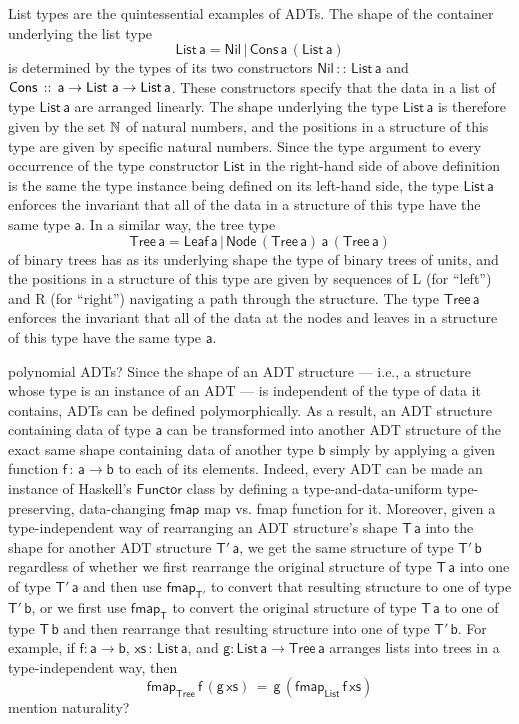 \documentclass[acmsmall,screen,review,anonymous]{acmart}
\theoremstyle{definition}
\begin{document}
List types are the quintessential examples of ADTs. The shape of the
container underlying the list type
\[\mathsf{List\,a} = \mathsf{Nil} \,|\, \mathsf{Cons\,a\,(List\,a)}\]
is determined by the types of its two constructors $\mathsf{Nil\, ::\,
  List\, a}$ and $\mathsf{Cons \,::\,a \to \mathsf{List}\,\,a\to
  List\,a}$. These constructors specify that the data in a list of
type $\mathsf{List\,a}$ are arranged linearly. The shape underlying
the type $\mathsf{List\,a}$ is therefore given by the set $\mathbb{N}$ of
natural numbers, and the positions in a structure of this type are
given by specific natural numbers. Since the type argument to every
occurrence of the type constructor $\mathsf{List}$ in the right-hand
side of above definition is the same the type instance being defined
on its left-hand side, the type $\mathsf{List\,a}$ enforces the
invariant that all of the data in a structure of this type have the
same type $\mathsf{a}$. In a similar way, the tree type
\[\mathsf{Tree\, a} = \mathsf{Leaf\,a}
\,|\,\mathsf{Node\,(Tree\,a)\,a\,(Tree\,a)}\] of binary trees
has as its underlying shape the type of binary trees of units, and the
positions in a structure of this type are given by sequences of L (for
``left'') and R (for ``right'') navigating a path
through the structure. The type $\mathsf{Tree\, a}$ enforces the
invariant that all of the data at the nodes and leaves in a structure
of this type have the same type $\mathsf{a}$.

{\color{blue} polynomial ADTs?} Since the shape of an ADT structure
--- i.e., a structure whose type is an instance of an ADT --- is
independent of the type of data it contains, ADTs can be defined
polymorphically. As a result, an ADT structure containing data of type
$\mathsf{a}$ can be transformed into another ADT structure of the
exact same shape containing data of another type $\mathsf{b}$ simply
by applying a given function $\mathsf{f \,:\,a \to b}$ to each of its
elements. Indeed, every ADT can be made an instance of Haskell's
$\mathsf{Functor}$ class by defining a type-and-data-uniform
type-preserving, data-changing $\mathsf{fmap}$ {\color{blue} map
  vs. fmap} function for it.  Moreover, given a type-independent way
of rearranging an ADT structure's shape $\mathsf{T\,a}$ into the shape
for another ADT structure $\mathsf{T'\,a}$, we get the same structure
of type $\mathsf{T'\,b}$ regardless of whether we first rearrange the
original structure of type $\mathsf{T\,a}$ into one of type
$\mathsf{T'\,a}$ and then use $\mathsf{fmap_{T'}}$ to convert that
resulting structure to one of type $\mathsf{T'\,b}$, or we first use
$\mathsf{fmap_T}$ to convert the original structure of type
$\mathsf{T\,a}$ to one of type $\mathsf{T\,b}$ and then rearrange that
resulting structure into one of type $\mathsf{T'\,b}$. For example, if
$\mathsf{f : a \to b}$, $\mathsf{xs \,:\,List\,a}$, and $\mathsf{g :
  List\,a\to Tree\,a}$ arranges lists into trees in a type-independent
way, then
\[\mathsf{fmap_{Tree}\,f\,(g \, xs) \,=\, g\,(fmap_{List}\,f\,xs)}\]
{\color{violet} mention naturality?}
\end{document}
